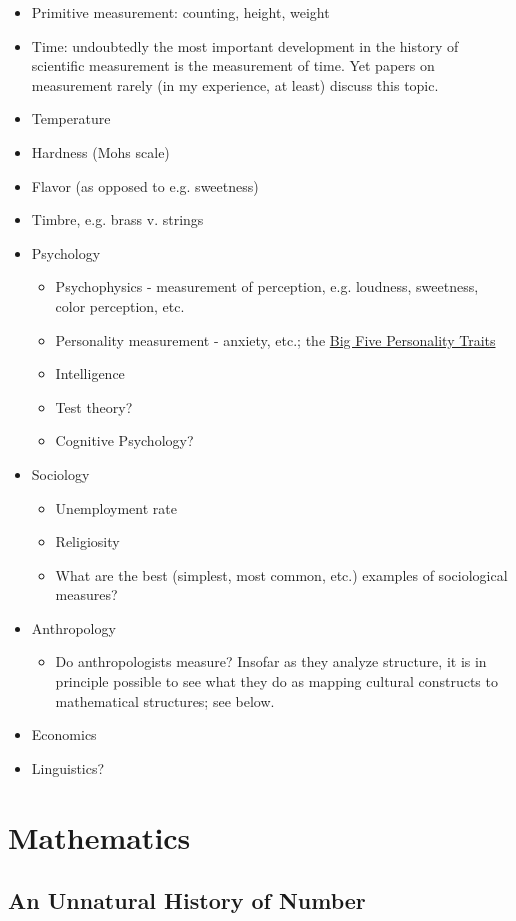 \documentclass[11pt,twoside]{article}
\begin{document}
\begin{itemize}
\item Primitive measurement: counting, height, weight
\item Time: undoubtedly the most important development in the history
  of scientific measurement is the measurement of time.  Yet papers on
  measurement rarely (in my experience, at least) discuss this topic.
\item Temperature
\item Hardness (Mohs scale)
\item Flavor (as opposed to e.g. sweetness)
\item Timbre, e.g. brass v. strings
\item Psychology
\begin{itemize}
\item Psychophysics - measurement of perception, e.g. loudness, sweetness, color perception, etc.
\item Personality measurement - anxiety, etc.; the \href{http://en.wikipedia.org/wiki/Big_Five_personality_traits}{Big Five Personality Traits}
\item Intelligence
\item Test theory?
\item Cognitive Psychology?
\end{itemize}
\item Sociology
\begin{itemize}
\item Unemployment rate
\item Religiosity
\item What are the best (simplest, most common, etc.) examples of sociological measures?
\end{itemize}
\item Anthropology
\begin{itemize}
\item Do anthropologists measure?  Insofar as they analyze structure,
  it is in principle possible to see what they do as mapping cultural
  constructs to mathematical structures; see below.
\end{itemize}
\item Economics
\item Linguistics?
\end{itemize}

\section{Mathematics}
\subsection{An Unnatural History of Number}
\end{document}
